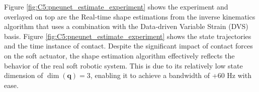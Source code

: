Figure \ref{fig:C5:pneunet_estimate_experiment} shows the experiment and overlayed on top are the Real-time shape estimations from the inverse kinematics algorithm that uses a combination with the Data-driven Variable Strain (DVS) basis. Figure \ref{fig:C5:pneunet_estimate_experiment} shows the state trajectories and the time instance of contact. Despite the significant impact of contact forces on the soft actuator, the shape estimation algorithm effectively reflects the behavior of the real soft robotic system. This is due to its relatively low state dimension of $\dim(\mathbf{q}) = 3$, enabling it to achieve a bandwidth of +60 \si{\hertz} with ease.
